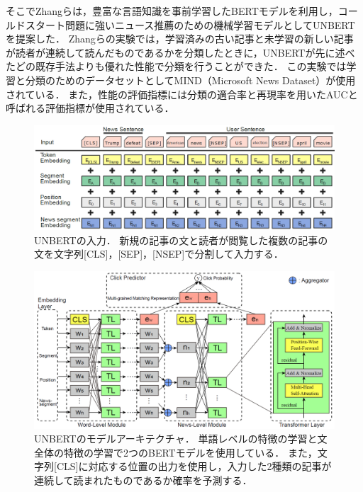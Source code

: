 \documentclass[12pt,a4j]{jreport}
\begin{document}
そこでZhangらは，豊富な言語知識を事前学習したBERTモデルを利用し，コールドスタート問題に強いニュース推薦のための機械学習モデルとしてUNBERTを提案した．
Zhangらの実験では，学習済みの古い記事と未学習の新しい記事が読者が連続して読んだものであるかを分類したときに，UNBERTが先に述べたどの既存手法よりも優れた性能で分類を行うことができた．
この実験では学習と分類のためのデータセットとしてMIND（Microsoft News Dataset）が使用されている．
また，性能の評価指標には分類の適合率と再現率を用いたAUCと呼ばれる評価指標が使用されている．

\begin{figure}[H]
	\centering
	\includegraphics[keepaspectratio, width=120mm]{img/unbert_inputs.png}
	\caption{
    UNBERTの入力．
    新規の記事の文と読者が閲覧した複数の記事の文を文字列[CLS]，[SEP]，[NSEP]で分割して入力する．
    \protect\footnotemark[10]
  }
	\label{fig_unbert_inputs}
\end{figure}

\begin{figure}[H]
	\centering
	\includegraphics[keepaspectratio, width=120mm]{img/unbert_model_architecture.png}
	\caption{
    UNBERTのモデルアーキテクチャ．
    単語レベルの特徴の学習と文全体の特徴の学習で2つのBERTモデルを使用している．
    また，文字列[CLS]に対応する位置の出力を使用し，入力した2種類の記事が連続して読まれたものであるか確率を予測する．
    \protect\footnotemark[11]
  }
	\label{fig_unbert_model_architecture}
\end{figure}
\end{document}

